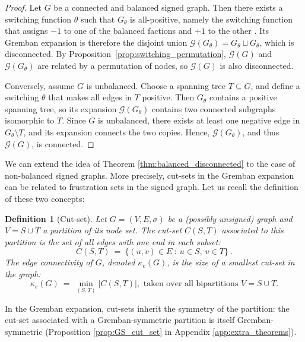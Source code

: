 \documentclass[reprint,onecolumn]{article}
\newtheorem{definition}[theorem]{Definition}  %
\newcommand{\1}{\mathbb{1}}
\newcommand{\0}{\mathbf{0}}
\begin{document}
\begin{proof}
Let \( G \) be a connected and balanced signed graph. Then there exists a switching function \( \theta \) such that \( G_\theta \) is all-positive, namely the switching function that assigns $-1$ to one of the balanced factions and $+1$ to the other \cite{diaz2025mathematical}. Its Gremban expansion is therefore the disjoint union \( \mathcal{G}(G_\theta) = G_\theta \sqcup G_\theta \), which is disconnected. By Proposition~\ref{prop:switching_permutation}, \( \mathcal{G}(G) \) and \( \mathcal{G}(G_\theta) \) are related by a permutation of nodes, so \( \mathcal{G}(G) \) is also disconnected.

Conversely, assume \( G \) is unbalanced. Choose a spanning tree \( T \subseteq G \), and define a switching \( \theta \) that makes all edges in \( T \) positive. Then \( G_\theta \) contains a positive spanning tree, so its expansion \( \mathcal{G}(G_\theta) \) contains two connected subgraphs isomorphic to \( T \). Since \( G \) is unbalanced, there exists at least one negative edge in \( G_\theta \setminus T \), and its expansion connects the two copies. Hence, \( \mathcal{G}(G_\theta) \), and thus \( \mathcal{G}(G) \), is connected.
\end{proof}
We can extend the idea of Theorem \ref{thm:balanced_disconnected} to the case of non-balanced signed graphs. More precisely, cut-sets in the Gremban expansion can be related to frustration sets in the signed graph. Let us recall the definition of these two concepts:

\begin{definition}[Cut-set]  \label{def:cut_set}
    Let $G=(V,E,\sigma)$ be a (possibly unsigned) graph and $V=S\cup T$ a partition of its node set. The \emph{cut-set} $C(S,T)$ associated to this partition is the set of all edges with one end in each subset:
    \[
        C(S,T)
        \ =\ 
        \bigl\{(u,v)\in E \ :\  u\in S,\ v\in T\}\ .
    \]
    The \emph{edge connectivity} of $G$, denoted $\kappa_e(G)$, is the size of a smallest cut-set in the graph:
    \[
        \kappa_e(G)\ =\ \min_{(S,T)}\bigl| C(S,T)\bigr| ,\text{ taken~over all bipartitions $V=S\cup T$.}
    \]
\end{definition}
In the Gremban expansion, cut-sets inherit the symmetry of the partition: the cut-set associated with a Gremban-symmetric partition is itself Gremban-symmetric (Proposition \ref{prop:GS_cut_set} in Appendix \ref{app:extra_theorems}).
\end{document}

